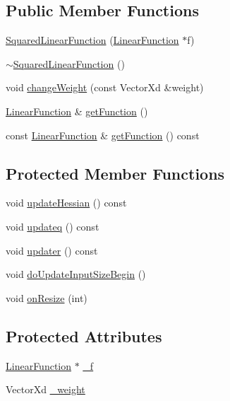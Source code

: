 \subsection*{Public Member Functions}
\begin{DoxyCompactItemize}
\item 
\hyperlink{classocra_1_1SquaredLinearFunction_ae0a8957e1371ef2681494298cd19c040}{Squared\+Linear\+Function} (\hyperlink{classocra_1_1LinearFunction}{Linear\+Function} $\ast$f)
\item 
\hyperlink{classocra_1_1SquaredLinearFunction_adc5c823cc6559151ef1081e8ff62624a}{$\sim$\+Squared\+Linear\+Function} ()
\item 
void \hyperlink{classocra_1_1SquaredLinearFunction_a4c8e5adac8c2d7af02880d4ac5011f83}{change\+Weight} (const Vector\+Xd \&weight)
\item 
\hyperlink{classocra_1_1LinearFunction}{Linear\+Function} \& \hyperlink{classocra_1_1SquaredLinearFunction_aff22d70c8edf05b5b488ffe6ce426e87}{get\+Function} ()
\item 
const \hyperlink{classocra_1_1LinearFunction}{Linear\+Function} \& \hyperlink{classocra_1_1SquaredLinearFunction_a0fb9f97558578c691b0df26264eb9e03}{get\+Function} () const 
\end{DoxyCompactItemize}
\subsection*{Protected Member Functions}
\begin{DoxyCompactItemize}
\item 
void \hyperlink{classocra_1_1SquaredLinearFunction_a3db0505f5c39253f2e61a7f122bbda66}{update\+Hessian} () const 
\item 
void \hyperlink{classocra_1_1SquaredLinearFunction_ad7ced298856b0562a4d18867dee5ab9e}{updateq} () const 
\item 
void \hyperlink{classocra_1_1SquaredLinearFunction_a2e717e193191778e8dff86ce76249b88}{updater} () const 
\item 
void \hyperlink{classocra_1_1SquaredLinearFunction_a95faea59867ec734fbdb46d936067d77}{do\+Update\+Input\+Size\+Begin} ()
\item 
void \hyperlink{classocra_1_1SquaredLinearFunction_a9e6a87607548f1f1eac56eecfc1b05b5}{on\+Resize} (int)
\end{DoxyCompactItemize}
\subsection*{Protected Attributes}
\begin{DoxyCompactItemize}
\item 
\hyperlink{classocra_1_1LinearFunction}{Linear\+Function} $\ast$ \hyperlink{classocra_1_1SquaredLinearFunction_a9848211537e6dc386ab237e6a1e233dc}{\+\_\+f}
\item 
Vector\+Xd \hyperlink{classocra_1_1SquaredLinearFunction_ad21985a66257244ce79648a507ad5220}{\+\_\+weight}
\end{DoxyCompactItemize}
